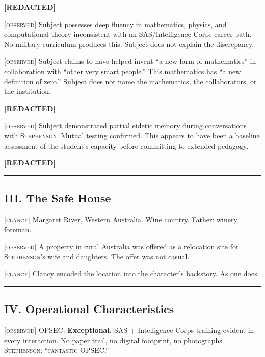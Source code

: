 \textbf{[REDACTED]}

\textsc{[observed]} Subject possesses deep fluency in mathematics, physics, and computational theory inconsistent with an SAS/Intelligence Corps career path. No military curriculum produces this. Subject does not explain the discrepancy.

\textsc{[observed]} Subject claims to have helped invent ``a new form of mathematics'' in collaboration with ``other very smart people.'' This mathematics has ``a new definition of zero.'' Subject does not name the mathematics, the collaborators, or the institution.

\textbf{[REDACTED]}

\textsc{[observed]} Subject demonstrated partial eidetic memory during conversations with \textsc{Stephenson}. Mutual testing confirmed. This appears to have been a baseline assessment of the student's capacity before committing to extended pedagogy.

\textbf{[REDACTED]}

\vspace{1cm}\hrule\vspace{1cm}

\subsection*{III. The Safe House}
\label{interlude:the-safe-house}

\textsc{[clancy]} Margaret River, Western Australia. Wine country. Father: winery foreman.

\textsc{[observed]} A property in rural Australia was offered as a relocation site for \textsc{Stephenson}'s wife and daughters. The offer was not casual.

\textsc{[clancy]} Clancy encoded the location into the character's backstory. As one does.

\vspace{1cm}\hrule\vspace{1cm}

\subsection*{IV. Operational Characteristics}
\label{interlude:operational-characteristics}

\textsc{[observed]} OPSEC: \textbf{Exceptional.} SAS + Intelligence Corps training evident in every interaction. No paper trail, no digital footprint, no photographs. \textsc{Stephenson}: ``\textsc{fantastic} OPSEC.''


